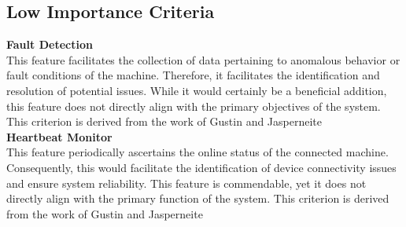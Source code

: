 \subsection{Low Importance Criteria}
\textbf{Fault Detection}\\
This feature facilitates the collection of data pertaining to anomalous behavior or fault conditions of the machine. Therefore, it facilitates the identification and resolution of potential issues. While it would certainly be a beneficial addition, this feature does not directly align with the primary objectives of the system.
This criterion is derived from the work of Gustin and Jasperneite\\
\textbf{Heartbeat Monitor}\\
This feature periodically ascertains the online status of the connected machine. Consequently, this would facilitate the identification of device connectivity issues and ensure system reliability.
This feature is commendable, yet it does not directly align with the primary function of the system.
This criterion is derived from the work of Gustin and Jasperneite\\\\


